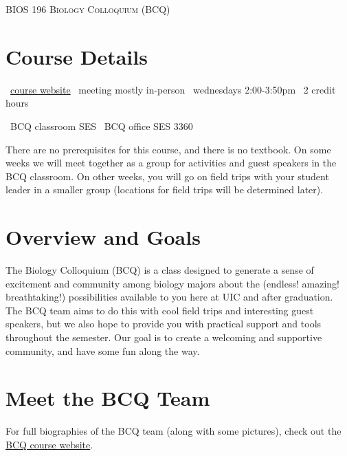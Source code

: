 \documentclass[]{article}
\begin{document}
\begin{center}
  \textsc{\large{BIOS 196 Biology Colloquium (BCQ)}}
  \end{center}


\section{Course Details}

\begin{center}

\faLaptop\ \href{www.link.com}{course website} \hspace{1.5mm} \faSchool\ meeting mostly in-person \hspace{1.5mm} \faClock\ wednesdays 2:00-3:50pm \hspace{1.5mm} \faCreditCard\  2 credit hours  

\faCompass\ BCQ classroom SES \hspace{1.5mm}  \faCompass\ BCQ office SES 3360
  
\end{center}


There are no prerequisites for this course, and there is no textbook. On some weeks we will meet together as a group for activities and guest speakers in the BCQ classroom. On other weeks, you will go on field trips with your student leader in a smaller group (locations for field trips will be determined later).

\section{Overview and Goals}

The Biology Colloquium (BCQ) is a class designed to generate a sense of excitement and community among biology majors about the (endless! amazing! breathtaking!) possibilities available to you here at UIC and after graduation. The BCQ team aims to do this with cool field trips and interesting guest speakers, but we also hope to provide you with practical support and tools throughout the semester. Our goal is to create a welcoming and supportive community, and have some fun along the way.

\section{Meet the BCQ Team}

For full biographies of the BCQ team (along with some pictures), check out the \href{www.link.com}{BCQ course website}.
\end{document}
